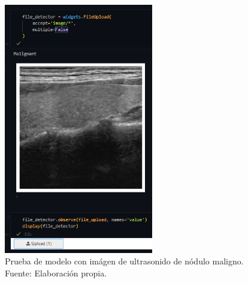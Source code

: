 \begin{figure}[H]
	\begin{center}
		\includegraphics[width=0.58\textwidth]{4/figures/upload_malign.png}
		\caption[Prueba de modelo con imágen de ultrasonido de nódulo maligno]{Prueba de modelo con imágen de ultrasonido de nódulo maligno. \\
		Fuente: Elaboración propia.}
		\label{4:fig170}
	\end{center}
\end{figure}


